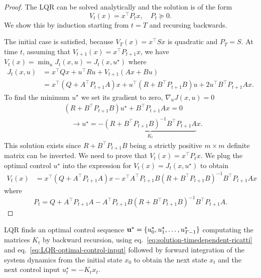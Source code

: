 \begin{proof}
  The LQR can be solved analytically and the solution is of the form
  \begin{equation}
    \label{eq:LQR-generic-solution}
    V_t(x) = x^\top P_tx,\quad P_t\succeq 0.
  \end{equation}
  We show this by induction starting from $t=T$ and recursing backwards.

  The initial case is satisfied, because $V_T(x) = x^\top Sx$ is quadratic and $P_T = S$. At time $t$, assuming that $V_{t+1}(x) = x^\top P_{t+1} x$, we have $V_t(x) = \min_u J_t(x,u) = J_t(x,u^\star)$ where
  \begin{align*}
    J_t(x,u) &= x^\top Qx + u^\top Ru + V_{t+1}(Ax+Bu) \\
             &= x^\top\left(Q + A^\top P_{t+1}A\right) x + u^\top\left(R + B^\top P_{t+1}B\right) u + 2u^\top B^\top P_{t+1}Ax.
  \end{align*}
  To find the minimum $u^\star$ we set its gradient to zero, $\nabla_{u} J(x,u) = 0$
  \begin{align}
    &\left(R + B^\top P_{t+1}B\right)u^\star + B^\top P_{t+1}A x = 0 \nonumber \\
    \label{eq:LQR-optimal-control-input}
    &\quad \rightarrow u^\star = -\underbrace{(R+B^\top P_{t+1}B)^{-1}B^\top P_{t+1}A}_{K_t}x.
  \end{align}
  This solution exists since $R+B^\top P_{t+1}B$ being a strictly positive $m\times m$ definite matrix can be inverted. We need to prove that $V_t(x)= x^\top P_t x$. We plug the optimal control $u^\star$ into the expression for $V_t(x)=J_t(x,u^\star)$ to obtain
  \begin{align*}
    V_t(x) &= x^\top \left(Q + A^\top P_{t+1}A\right) x - x^\top A^\top P_{t+1}B\left(R+B^\top P_{t+1}B\right)^{-1}B^\top P_{t+1}Ax
  \end{align*}
  where
  \begin{equation}
    \label{eq:solution-timedependent-ricatti}
    P_t = Q + A^\top P_{t+1}A - A^\top P_{t+1}B\left(R+B^\top P_{t+1}B\right)^{-1}B^\top P_{t+1}A.
  \end{equation}
\end{proof}

LQR finds an optimal control sequence $\boldsymbol{\mathrm{u}}^\star = \{u_0^\star, u_1^\star,\ldots,u_{T-1}^\star\}$ computating the matrices $K_t$ by backward recursion, using eq.~\eqref{eq:solution-timedependent-ricatti} and eq.~\eqref{eq:LQR-optimal-control-input} followed by forward integration of the system dynamics from the initial state $x_0$ to obtain the next state $x_t$ and the next control input $u_t^\star = -K_tx_t$.

